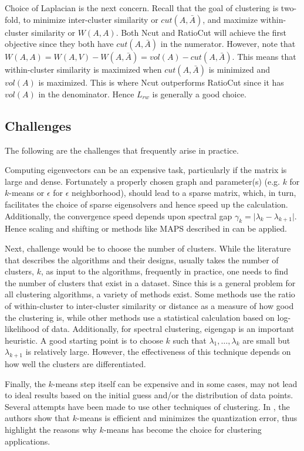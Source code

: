 \documentclass[10pt,a4paper, nocenter]{report}
\newcommand{\abs}[1]{\lvert {#1} \rvert}
\begin{document}
    Choice of Laplacian is the next concern. Recall that the goal of clustering is two-fold, to minimize inter-cluster similarity or $cut(A,\bar{A})$, and maximize within-cluster similarity or $W(A,A)$. Both Ncut and RatioCut will achieve the first objective since they both have $cut(A,\bar{A})$ in the numerator. However, note that $W(A,A) = W(A,V) - W(A,\bar{A}) = vol(A) - cut(A,\bar{A})$. This means that within-cluster similarity is maximized when $cut(A,\bar{A})$ is minimized and $vol(A)$ is maximized. This is where Ncut outperforms RatioCut since it has $vol(A)$ in the denominator. Hence $L_{rw}$ is generally a good choice.

    \subsection{Challenges}

    The following are the challenges that frequently arise in practice. 

    Computing eigenvectors can be an expensive task, particularly if the matrix is large and dense. Fortunately a properly chosen graph and parameter(s) (e.g. $k$ for $k$-means or $\epsilon$ for $\epsilon$ neighborhood), should lead to a sparse matrix, which, in turn, facilitates the choice of sparse eigensolvers and hence speed up the calculation. Additionally, the convergence speed depends upon spectral gap $\gamma_k = \abs{\lambda_k - \lambda_{k+1}}$. Hence scaling and shifting or methods like MAPS described in \cite{Lu2015AcceleratedAF} can be applied. 

    Next, challenge would be to choose the number of clusters. While the literature that describes the algorithms and their designs, usually takes the number of clusters, $k$, as input to the algorithms, frequently in practice, one needs to find the number of clusters that exist in a dataset. Since this is a general problem for all clustering algorithms, a variety of methods exist. Some methods use the ratio of within-cluster to inter-cluster similarity or distance as a measure of how good the clustering is, while other methods use a statistical calculation based on log-likelihood of data. Additionally, for spectral clustering, eigengap is an important heuristic. A good starting point is to choose $k$ such that $\lambda_1,\dots,\lambda_k$ are small but $\lambda_{k+1}$ is relatively large. However, the effectiveness of this technique depends on how well the clusters are differentiated.

    Finally, the $k$-means step itself can be expensive and in some cases, may not lead to ideal results based on the initial guess and/or the distribution of data points. Several attempts have been made to use other techniques of clustering. In \cite{Bottou95convergenceproperties}, the authors show that $k$-means is efficient and minimizes the quantization error, thus highlight the reasons why $k$-means has become the choice for clustering applications. 
    
\end{document}
